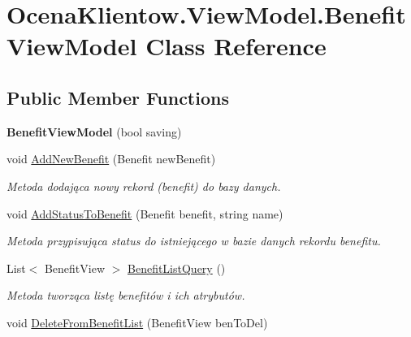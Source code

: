\hypertarget{class_ocena_klientow_1_1_view_model_1_1_benefit_view_model}{}\section{Ocena\+Klientow.\+View\+Model.\+Benefit\+View\+Model Class Reference}
\label{class_ocena_klientow_1_1_view_model_1_1_benefit_view_model}
\subsection*{Public Member Functions}
\begin{DoxyCompactItemize}
\item 
\hypertarget{class_ocena_klientow_1_1_view_model_1_1_benefit_view_model_a11bcfa34fbadef40b5bce5aae3e4f92f}{}\label{class_ocena_klientow_1_1_view_model_1_1_benefit_view_model_a11bcfa34fbadef40b5bce5aae3e4f92f} 
{\bfseries Benefit\+View\+Model} (bool saving)
\item 
void \hyperlink{class_ocena_klientow_1_1_view_model_1_1_benefit_view_model_ad8a6a78aa63e7cbd0bc677627b8c34b9}{Add\+New\+Benefit} (Benefit new\+Benefit)
\begin{DoxyCompactList}\small\item\em Metoda dodająca nowy rekord (benefit) do bazy danych. \end{DoxyCompactList}\item 
void \hyperlink{class_ocena_klientow_1_1_view_model_1_1_benefit_view_model_a67b27437f2c0a3a9ced48dc1fb1f8658}{Add\+Status\+To\+Benefit} (Benefit benefit, string name)
\begin{DoxyCompactList}\small\item\em Metoda przypisująca status do istniejącego w bazie danych rekordu benefitu. \end{DoxyCompactList}\item 
List$<$ Benefit\+View $>$ \hyperlink{class_ocena_klientow_1_1_view_model_1_1_benefit_view_model_a384e8afb520c3255a8e0ae76a6f56b0d}{Benefit\+List\+Query} ()
\begin{DoxyCompactList}\small\item\em Metoda tworząca listę benefitów i ich atrybutów. \end{DoxyCompactList}\item 
void \hyperlink{class_ocena_klientow_1_1_view_model_1_1_benefit_view_model_a2da1cc3a788a6f592199b90410159abe}{Delete\+From\+Benefit\+List} (Benefit\+View ben\+To\+Del)

\end{DoxyCompactItemize}
